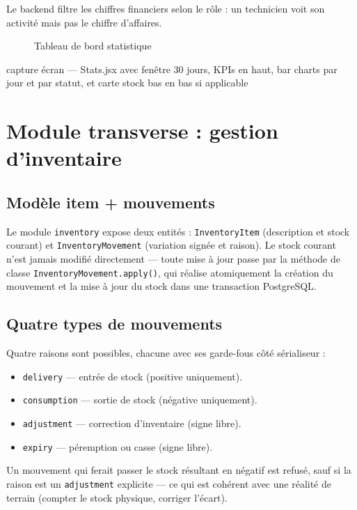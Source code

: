 \documentclass[12pt, a4paper, oneside]{report}
\newcommand{\placeholderFigure}[3][0.75]{%
  \begin{figure}[ht]
    \centering
    \fbox{\begin{minipage}[c][6.5cm][c]{#1\linewidth}
      \centering
      \textit{\small À insérer : #3}
    \end{minipage}}
    \caption{#2}
    \label{fig:#3}
  \end{figure}%
}
\begin{document}
Le backend filtre les chiffres financiers selon le rôle : un
technicien voit son activité mais pas le chiffre d'affaires.

\placeholderFigure{Tableau de bord statistique}%
{stats-screen}{capture écran — Stats.jsx avec fenêtre 30 jours, KPIs
en haut, bar charts par jour et par statut, et carte stock bas en bas
si applicable}

\section{Module transverse : gestion d'inventaire}

\subsection{Modèle item + mouvements}
Le module \texttt{inventory} expose deux entités :
\texttt{InventoryItem} (description et stock courant) et
\texttt{InventoryMovement} (variation signée et raison). Le stock
courant n'est jamais modifié directement — toute mise à jour passe
par la méthode de classe \texttt{InventoryMovement.apply()}, qui
réalise atomiquement la création du mouvement et la mise à jour du
stock dans une transaction PostgreSQL.

\subsection{Quatre types de mouvements}
Quatre raisons sont possibles, chacune avec ses garde-fous côté
sérialiseur :

\begin{itemize}
  \item \texttt{delivery} — entrée de stock (positive uniquement).
  \item \texttt{consumption} — sortie de stock (négative uniquement).
  \item \texttt{adjustment} — correction d'inventaire (signe libre).
  \item \texttt{expiry} — péremption ou casse (signe libre).
\end{itemize}

Un mouvement qui ferait passer le stock résultant en négatif est
refusé, sauf si la raison est un \texttt{adjustment} explicite — ce
qui est cohérent avec une réalité de terrain (compter le stock
physique, corriger l'écart).
\end{document}
